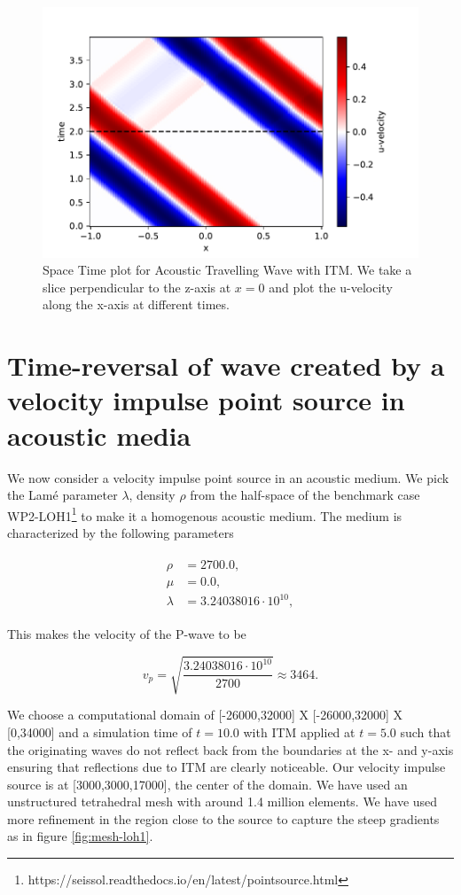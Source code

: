 \begin{figure}
    \centering
    \includegraphics[width=0.75\linewidth]{figures/space-time-plot-travelling.pdf}
    \caption{Space Time plot for Acoustic Travelling Wave with \ac{ITM}. We take a slice perpendicular to the z-axis at $x=0$ and plot the u-velocity along the x-axis at different times.}
    \label{fig:space-timeplot-travelling}
\end{figure}

\section{Time-reversal of wave created by a velocity impulse point source in acoustic media} \label{sec:acousticITM}

We now consider a velocity impulse point source in an acoustic medium. We pick the Lam\'{e} parameter $\lambda$, density $\rho$ 
from the half-space of the benchmark case WP2-LOH1\footnote[1]{https://seissol.readthedocs.io/en/latest/pointsource.html} to make it a homogenous acoustic medium. 
The medium is characterized by the following parameters

\begin{align}
    \begin{split}
        \rho &=    2700.0 ,\\
        \mu &=     0.0 ,\\
        \lambda &= 3.24038016 \cdot 10^{10},
    \end{split}
\end{align}

This makes the velocity of the P-wave to be

\begin{equation}
    v_p = \sqrt{\frac{3.24038016 \cdot 10^{10}}{2700}} \approx 3464 .
\end{equation}

We choose a computational domain of [-26000,32000] X [-26000,32000] X [0,34000] and a simulation time of $t=10.0$ with \ac{ITM} applied at $t=5.0$ 
such that the originating waves do not reflect back from the boundaries at the x- and y-axis ensuring that
reflections due to \ac{ITM} are clearly noticeable. 
Our velocity impulse source is at [3000,3000,17000], the center of the domain. 
We have used an unstructured tetrahedral mesh with around 1.4 million elements. We have used more refinement in the region close to the source to capture the steep gradients as in figure \ref{fig:mesh-loh1}.

